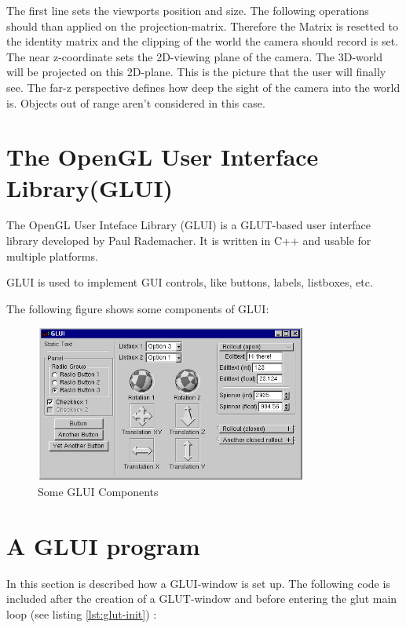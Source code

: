 \documentclass[10pt,a4paper,DIV=11]{scrreprt}
\begin{document}
The first line sets the viewports position and size. The following operations should than applied on the projection-matrix. Therefore the Matrix is resetted to the identity matrix and the clipping of the world the camera should record is set. The near z-coordinate sets the 2D-viewing plane of the camera. The 3D-world will be projected on this 2D-plane. This is the picture that the user will finally see. The far-z perspective defines how deep the sight of the camera into the world is. Objects out of range aren't considered in this case. \\

\section{The OpenGL User Interface Library(GLUI)}
The OpenGL User Inteface Library (GLUI) is a GLUT-based user interface library developed by Paul Rademacher\cite{rad}. It is written in C++ and usable for multiple platforms.

GLUI is used to implement GUI controls, like buttons, labels, listboxes, etc.

The following figure shows some components of GLUI:

\begin{center}
	\begin{figure}[H]
		\centering
		\includegraphics[width=0.8\textwidth,scale=1.0]{files/glui.png}  
		\caption{Some GLUI Components \cite{rad}}
		\label{fig:ogl-glui}
	\end{figure}
\end{center}

\newpage

\section{A GLUI program}
In this section is described how a GLUI-window is set up.
The following code is included after the creation of a GLUT-window and before entering the glut main loop (see listing \ref{lst:glut-init}) :
\end{document}
